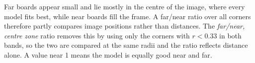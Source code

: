 Far boards appear small and lie mostly in the centre of the image, where every model fits best, while near boards
fill the frame. A far/near ratio over all corners therefore partly compares image positions rather than
distances. The \emph{far/near, centre zone} ratio removes this by using only the corners with $r < 0.33$ in both
bands, so the two are compared at the same radii and the ratio reflects distance alone. A value near 1 means
the model is equally good near and far.
